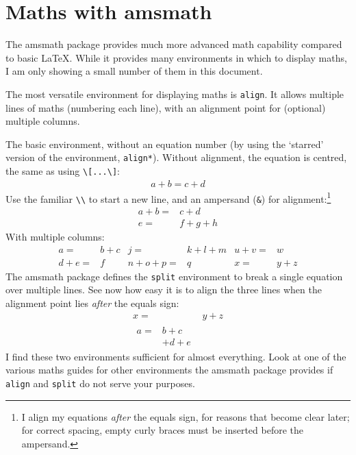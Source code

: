 \documentclass[12pt,article]{memoir}
\begin{document}
\chapter*{Maths with \textsf{amsmath}}

The \textsf{amsmath} package provides much more advanced math capability compared to basic \LaTeX . While it provides many environments in which to display maths, I am only showing a small number of them in this document.

The most versatile environment for displaying maths is \texttt{align}. It allows multiple lines of maths (numbering each line), with an alignment point for (optional) multiple columns.

The basic environment, without an equation number (by using the `starred' version of the environment, \verb|align*|). Without alignment, the equation is centred, the same as using \verb|\[...\]|:
\begin{align*}
	a + b = c + d
\end{align*}
%
Use the familiar \verb|\\| to start a new line, and an ampersand (\verb|&|) for alignment:\footnote{I align my equations \emph{after} the equals sign, for reasons that become clear later; for correct spacing, empty curly braces must be inserted before the ampersand.}
\begin{align}
	a + b = {}& c + d \\
	e = {}& f + g + h
\end{align}
%
With multiple columns:
\begin{align}
	a = {}& b + c 	&	j = {}& k + l + m 	&	u + v = {}& w \\
	d + e = {}& f 	&	n + o + p = {}& q 	&	x = {}& y + z
\end{align}
%
The \textsf{amsmath} package defines the \texttt{split} environment to break a single equation over multiple lines. See now how easy it is to align the three lines when the alignment point lies \emph{after} the equals sign:
\begin{align}
	x = {}& y + z \\
	\begin{split}
		a = {}& b + c \\
		{}& + d + e
	\end{split}
\end{align}
%
I find these two environments sufficient for almost everything. Look at one of the various maths guides for other environments the \textsf{amsmath} package provides if \texttt{align} and \texttt{split} do not serve your purposes.
\end{document}
